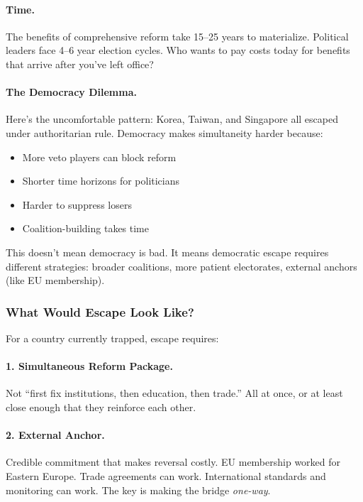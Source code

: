 \paragraph{Time.}
The benefits of comprehensive reform take 15--25 years to materialize. 
Political leaders face 4--6 year election cycles. Who wants to pay costs 
today for benefits that arrive after you've left office?

\paragraph{The Democracy Dilemma.}
Here's the uncomfortable pattern: Korea, Taiwan, and Singapore all escaped 
under authoritarian rule. Democracy makes simultaneity harder because:
\begin{itemize}
    \item More veto players can block reform
    \item Shorter time horizons for politicians
    \item Harder to suppress losers
    \item Coalition-building takes time
\end{itemize}

This doesn't mean democracy is bad. It means democratic escape requires 
different strategies: broader coalitions, more patient electorates, 
external anchors (like EU membership).

\subsubsection{What Would Escape Look Like?}

For a country currently trapped, escape requires:

\paragraph{1. Simultaneous Reform Package.}
Not ``first fix institutions, then education, then trade.'' All at once, 
or at least close enough that they reinforce each other.

\paragraph{2. External Anchor.}
Credible commitment that makes reversal costly. EU membership worked 
for Eastern Europe. Trade agreements can work. International standards 
and monitoring can work. The key is making the bridge \emph{one-way}.

